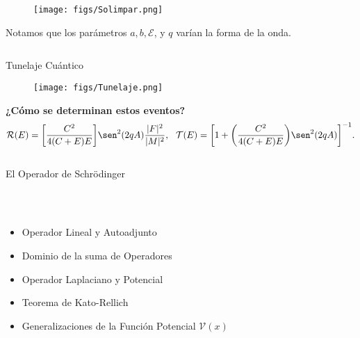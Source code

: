 \documentclass[aspectratio=1610]{beamer}
\begin{document}
\begin{frame}{}
\begin{figure}[h]
    \centering
    \texttt{[image: figs/Solimpar.png]}
\end{figure}
Notamos que los parámetros
$a,b,\mathcal{E}$, y $q$ varían la forma de la onda.
    
\begin{columns}
\column{37em}
\end{columns}
\end{frame}

\begin{frame}{Tunelaje Cuántico}

\begin{figure}[h]
    \centering
    \texttt{[image: figs/Tunelaje.png]}
\end{figure}
\textbf{\textcolor{Ocean}{¿Cómo se determinan estos eventos?}}
\begin{align*}
    \mathcal{R}(E) = \bigg[\frac{C^2}{4(C+E)E}\bigg]\sen^2(2qA)\frac{|F|^2}{|M|^2}, \:\:\:
    \mathcal{T}(E) = 
    \bigg[1+\bigg(\frac{C^2}{4(C+E)E}\bigg)\sen^2(2qA)\bigg] ^{-1}.
\end{align*}

    
\begin{columns}
\column{37em}
\end{columns}
\end{frame}
\begin{frame}
\begin{columns}
\column{37em}
\vspace{1cm}
\Huge{\centerline{El Operador de Schrödinger}}
\end{columns}
\end{frame}


\begin{frame}
\frametitle{ }
\begin{columns}
\column{37em}
\begin{itemize}\itemsep1em
  \justifying
  \item  \textcolor{Ocean}{Operador Lineal y Autoadjunto} 
  \item  \textcolor{Ocean}{Dominio de la suma de Operadores} 
  \item  \textcolor{TextGreen}{Operador Laplaciano y Potencial}
  \item  \textcolor{TextGreen}{Teorema de Kato-Rellich}
  \item  \textcolor{TextGreen}{Generalizaciones de la Función Potencial $\mathcal{V}(x)$}
\end{itemize}
\end{columns}
\end{frame}
\end{document}
